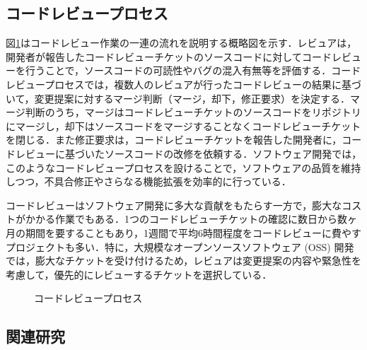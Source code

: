 \documentclass[submit]{ipsj}
\begin{document}
\subsection{コードレビュープロセス}
図\ref{fig:codereviewprocess}はコードレビュー作業の一連の流れを説明する概略図を示す．レビュアは，開発者が報告したコードレビューチケットのソースコードに対してコードレビューを行うことで，ソースコードの可読性やバグの混入有無等を評価する．コードレビュープロセスでは，複数人のレビュアが行ったコードレビューの結果に基づいて，変更提案に対するマージ判断（マージ，却下，修正要求）を決定する．マージ判断のうち，マージはコードレビューチケットのソースコードをリポジトリにマージし，却下はソースコードをマージすることなくコードレビューチケットを閉じる．また修正要求は，コードレビューチケットを報告した開発者に，コードレビューに基づいたソースコードの改修を依頼する．ソフトウェア開発では，このようなコードレビュープロセスを設けることで，ソフトウェアの品質を維持しつつ，不具合修正やさらなる機能拡張を効率的に行っている．

コードレビューはソフトウェア開発に多大な貢献をもたらす一方で，膨大なコストがかかる作業でもある．1つのコードレビューチケットの確認に数日から数ヶ月の期間を要することもあり，1週間で平均6時間程度をコードレビューに費やすプロジェクトも多い\cite{review2}．特に，大規模なオープンソースソフトウェア (OSS) 開発では，膨大なチケットを受け付けるため，レビュアは変更提案の内容や緊急性を考慮して，優先的にレビューするチケットを選択している\cite{integrator}．

\begin{figure}[h]
\begin{center}
\caption{コードレビュープロセス}
\label{fig:codereviewprocess}
\end{center}
\end{figure}

\subsection{関連研究}
\end{document}

